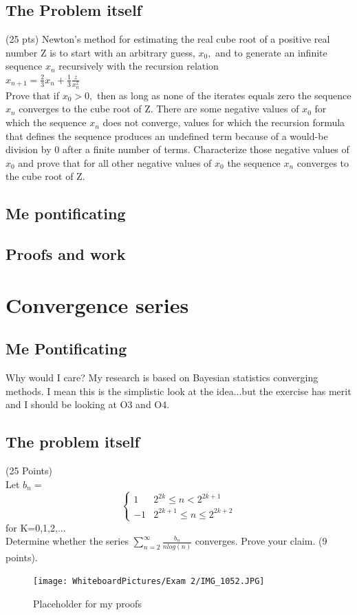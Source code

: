 \subsection{The Problem itself}
(25 pts) Newton's method for estimating the real cube root of a positive real number Z is to start with an arbitrary guess, $x_0,$ and to generate an infinite sequence ${x_n}$ recursively with the recursion relation \\ 
$x_{n+1}=\frac{2}{3}x_{n}+\frac{1}{3}\frac{z}{x_n^2}$\\ 

Prove that if $x_0 >0, $ then as long as none of the iterates equals zero the sequence ${x_n}$ converges to the cube root of Z. There are some negative values of $x_0$ for which the sequence ${x_n}$ does not converge, values for which the recursion formula that defines the sequence produces an undefined term because of a would-be division by 0 after a finite number of terms. Characterize those negative values of $x_0$ and prove that for all other negative values of $x_0$ the sequence ${x_n}$ converges to the cube root of Z.

\subsection{Me pontificating}

\subsection{Proofs and work }


\section{Convergence series}


\subsection{Me Pontificating}
Why would I care? My research is based on Bayesian statistics converging methods. I mean this is the simplistic look at the idea...but the exercise has merit and I should be looking at O3 and O4.  
\subsection{The problem itself}
(25 Points) \\ 
Let $b_n=$ \[ \begin{cases} 
      1 & 2^{2k}\leq n <2^{2k+1} \\
      -1 & 2^{2k+1} \leq n\leq 2^{2k+2} 
   \end{cases}
\] 
for K=0,1,2,... \\ 
Determine whether the series $\sum_{n=2}^\infty \frac{b_n}{n log(n)}$ converges. Prove your claim. (9 points). \\ 
\begin{figure}[h]\begin{center}\texttt{[image: WhiteboardPictures/Exam 2/IMG\_1052.JPG]}
\caption{Placeholder for my proofs} \label{fig:Euler_pic}\end{center}\end{figure} 

